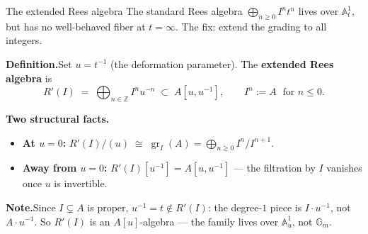 \documentclass[aspectratio=169,12pt]{beamer}
\begin{document}

\begin{frame}{The extended Rees algebra}
  The standard Rees algebra $\bigoplus_{n \geq 0} I^n t^n$ lives over $\mathbb{A}^1_t$,
  but has no well-behaved fiber at $t = \infty$.
  The fix: extend the grading to all integers.

  \medskip

  \textbf{Definition.}\enspace Set $u = t^{-1}$ (the deformation parameter).
  The \textbf{extended Rees algebra} is
  \[
    R'(I) \;=\; \bigoplus_{n \in \mathbb{Z}} I^n u^{-n} \;\subset\; A[u, u^{-1}],
    \qquad I^n := A \;\text{ for } n \leq 0.
  \]

  \medskip

  \textbf{Two structural facts.}
  \begin{itemize}
    \item \textbf{At $u = 0$:}\enspace
          $R'(I)/(u) \;\cong\; \operatorname{gr}_I(A) = \bigoplus_{n \geq 0} I^n/I^{n+1}$.
    \item \textbf{Away from $u = 0$:}\enspace
          $R'(I)[u^{-1}] = A[u, u^{-1}]$ — the filtration by $I$ vanishes
          once $u$ is invertible.
  \end{itemize}

  \medskip

  \textbf{Note.}\enspace Since $I \subsetneq A$ is proper, $u^{-1} = t \notin R'(I)$:
  the degree-$1$ piece is $I \cdot u^{-1}$, not $A \cdot u^{-1}$.
  So $R'(I)$ is an $A[u]$-algebra — the family lives over $\mathbb{A}^1_u$, not $\mathbb{G}_m$.
\end{frame}
\end{document}
